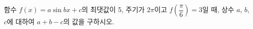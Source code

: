 함수 $f(x)=a\sin bx+c$의 최댓값이 5, 주기가 $2\pi$이고 $f\left(\dfrac{\pi}{6}\right)=3$일 때, 상수 $a$, $b$, $c$에 대하여 $a+b-c$의 값을 구하시오. 
